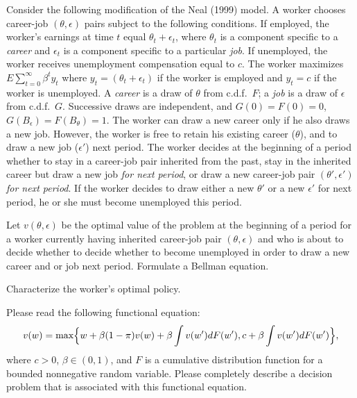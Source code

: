 \medskip
{} 
\medskip
\noindent Consider the following modification of the Neal (1999) model.
 A worker chooses career-job $(\theta,\epsilon)$ pairs
subject to the following conditions.  If employed, the worker's earnings
at time $t$ equal $\theta_t + \epsilon_t$, where $\theta_t$ is a component specific to a {\it career\/}
and ${\epsilon_t}$ is a component specific to a particular {\it job}.  If unemployed, the worker
receives unemployment compensation equal to $c$.  The worker
maximizes $E \sum_{t=0}^\infty  \beta^t  y_t $ where $y_t = (\theta_t + \epsilon_t)$ if the worker is employed
and $y_t = c$ if the worker is unemployed.
A {\it career\/} is a draw
of $\theta$ from  c.d.f.\  $F$; a {\it job\/} is a draw of
$\epsilon$ from c.d.f.\ $G$.   Successive draws are independent,
and $G(0)=F(0)=0$, $G(B_\epsilon)= F(B_\theta)=1$.  The
worker can draw a new career only if he also draws a
new job.
 However, the worker is free to retain his existing
career ($\theta$), and to draw a new job ($\epsilon'$) next period.  The worker
decides at the beginning of a period whether to stay in a
career-job pair inherited from the past, stay in the inherited career but
draw  a new job {\it for next period\/}, or  draw a new career-job pair $(\theta', \epsilon')$ {\it for next period}.  If the worker decides to
draw either a new $\theta'$ or a new $\epsilon'$ for next period, he or she must   become unemployed this period.


\medskip
{} Let $v(\theta,\epsilon)$ be the optimal value of the problem
at the beginning of a period
for a worker currently having inherited  career-job pair $(\theta,\epsilon)$ and
who is about to decide whether to decide whether to become unemployed in order to draw a new career and  or job next period.
Formulate a Bellman equation.

\medskip
{} Characterize the worker's optimal policy.

\vfil\eject

\medskip
{} 
\medskip
\noindent
Please read the following functional equation:
$$
v(w) = \max \Bigl\{ w + \beta (1 - \pi) v(w) + \beta \int v(w') d F(w'), c + \beta \int v(w') d F(w') \Bigr\},
$$
where $c > 0$, $\beta \in (0,1)$, and $F$ is a cumulative distribution function for a bounded  nonnegative random variable.
Please completely describe a decision problem that is associated with this functional equation.




